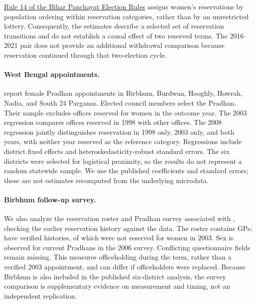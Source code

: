 \href{https://sec.bihar.gov.in/Documents/Panchayat_Act_Rule/RULE_Bihar%20Panchayat%20Election%20Rules%202006%20-%28%20English%29.pdf}{Rule 14 of the Bihar Panchayat Election Rules} assigns women's reservations by population ordering within reservation categories, rather than by an unrestricted lottery. Consequently, the estimates describe a selected set of reservation transitions and do not establish a causal effect of two reserved terms. The 2016--2021 pair does not provide an additional withdrawal comparison because reservation continued through that two-election cycle.

\paragraph{West Bengal appointments.} \citet[Table~III]{beaman2009powerful} report female Pradhan appointments in Birbhum, Burdwan, Hooghly, Howrah, Nadia, and South 24 Parganas. Elected council members select the Pradhan. Their sample excludes offices reserved for women in the outcome year. The 2003 regression compares offices reserved in 1998 with other offices. The 2008 regression jointly distinguishes reservation in 1998 only, 2003 only, and both years, with neither year reserved as the reference category. Regressions include district fixed effects and heteroskedasticity-robust standard errors. The six districts were selected for logistical proximity, so the results do not represent a random statewide sample. We use the published coefficients and standard errors; these are not estimates recomputed from the underlying microdata.

\paragraph{Birbhum follow-up survey.} We also analyze the reservation roster and Pradhan survey associated with \citet{beaman2009powerful}, checking the earlier reservation history against the \citet{chattopadhyay2004women} data. The roster contains \appWbRoster{} GPs; \appWbHistory{} have verified histories, of which \appWbOpen{} were not reserved for women in 2003. Sex is observed for \appWbObserved{} current Pradhans in the 2006 survey. Conflicting questionnaire fields remain missing. This measures officeholding during the term, rather than a verified 2003 appointment, and can differ if officeholders were replaced. Because Birbhum is also included in the published six-district analysis, the survey comparison is supplementary evidence on measurement and timing, not an independent replication.

